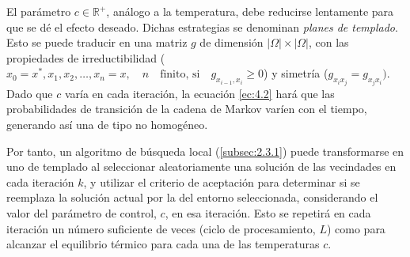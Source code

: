El parámetro $c \in \mathbb{R^{+}}$, análogo a la temperatura, debe reducirse lentamente para que se dé el efecto deseado. Dichas estrategias se denominan \textsl{planes de templado}.
Esto se puede traducir en una matriz $g$ de dimensión $|\varOmega|\times|\varOmega|$, con las propiedades de irreductibilidad ($x_0 = x^*, x_1, x_2, \dots, x_n = x, \quad n \quad \text{finito, si} \quad g_{x_{i-1},x_i} \geq 0$) y simetría ($g_{x_i x_j} = g_{x_j x_i})$.
Dado que $c$ varía en cada iteración, la ecuación \ref{ec:4.2} hará que las probabilidades de transición de la cadena de Markov varíen con el tiempo, generando así una de tipo no homogéneo.

Por tanto, un algoritmo de búsqueda local (\ref{subsec:2.3.1}) puede transformarse en uno de templado al seleccionar aleatoriamente una solución de las vecindades en cada iteración $k$, y utilizar el criterio de aceptación para determinar si se reemplaza la solución actual por la del entorno seleccionada, considerando el valor del parámetro de control, $c$, en esa iteración. Esto se repetirá en cada iteración un número suficiente de veces (ciclo de procesamiento, $L$) como para alcanzar el equilibrio térmico para cada una de las temperaturas $c$.

